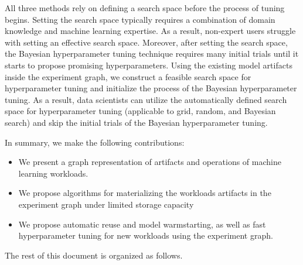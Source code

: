 All three methods rely on defining a search space before the process of tuning begins.
Setting the search space typically requires a combination of domain knowledge and machine learning expertise.
As a result, non-expert users struggle with setting an effective search space.
Moreover, after setting the search space, the Bayesian hyperparameter tuning technique requires many initial trials until it starts to propose promising hyperparameters.
Using the existing model artifacts inside the experiment graph, we construct a feasible search space for hyperparameter tuning and initialize the process of the Bayesian hyperparameter tuning.
As a result, data scientists can utilize the automatically defined search space for hyperparameter tuning (applicable to grid, random, and Bayesian search) and skip the initial trials of the Bayesian hyperparameter tuning.

In summary, we make the following contributions:
\begin{itemize}
\item We present a graph representation of artifacts and operations of machine learning workloads.
\item We propose algorithms for materializing the workloads artifacts in the experiment graph under limited storage capacity
\item We propose automatic reuse and model warmstarting, as well as fast hyperparameter tuning for new workloads using the experiment graph.
\end{itemize}

The rest of this document is organized as follows.